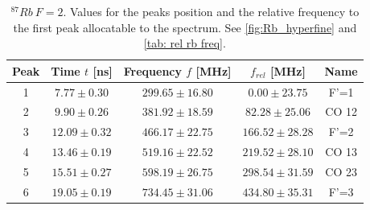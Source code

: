 \documentclass[]{article}
\begin{document}
\begin{table}[H]
\centering
\begin{tabular}{|c|c|c|||c|c|}
\hline
Peak & Time $t$ [ns] & Frequency $f$ [MHz] & $f_{rel}$ [MHz] & Name \\ \hline\hline
1 & $7.77 \pm 0.30$  & $299.65 \pm 16.80$  & $0.00 \pm 23.75$  & F'=1 \\ \hline
2 & $9.90 \pm 0.26$  & $381.92 \pm 18.59$  & $82.28 \pm 25.06$  & CO 12 \\ \hline
3 & $12.09 \pm 0.32$  & $466.17 \pm 22.75$  & $166.52 \pm 28.28$  & F'=2 \\ \hline
4 & $13.46 \pm 0.19$  & $519.16 \pm 22.52$  & $219.52 \pm 28.10$  & CO 13 \\ \hline
5 & $15.51 \pm 0.27$  & $598.19 \pm 26.75$  & $298.54 \pm 31.59$  & CO 23 \\ \hline
6 & $19.05 \pm 0.19$  & $734.45 \pm 31.06$  & $434.80 \pm 35.31$  & F'=3 \\ \hline
\hline
\end{tabular}
\caption{$^{87}Rb\ F=2 $. Values for the peaks position and the relative frequency to the first peak allocatable to the spectrum. See \autoref{fig:Rb_hyperfine} and \autoref{tab: rel rb freq}.}
\end{table}


\newpage
\end{document}
